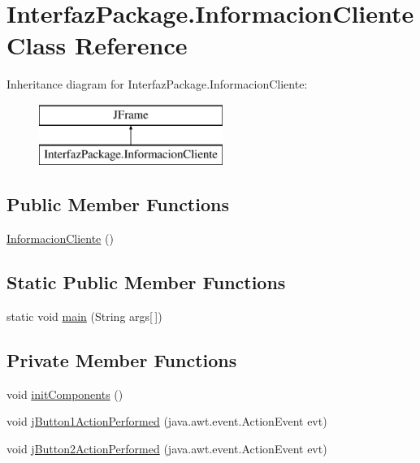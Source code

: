 \hypertarget{class_interfaz_package_1_1_informacion_cliente}{}\section{Interfaz\+Package.\+Informacion\+Cliente Class Reference}
\label{class_interfaz_package_1_1_informacion_cliente}
Inheritance diagram for Interfaz\+Package.\+Informacion\+Cliente\+:\begin{figure}[H]
\begin{center}
\leavevmode
\includegraphics[height=2.000000cm]{class_interfaz_package_1_1_informacion_cliente}
\end{center}
\end{figure}
\subsection*{Public Member Functions}
\begin{DoxyCompactItemize}
\item 
\mbox{\hyperlink{class_interfaz_package_1_1_informacion_cliente_aad6339ab89c410c65ca97dc545479efb}{Informacion\+Cliente}} ()
\end{DoxyCompactItemize}
\subsection*{Static Public Member Functions}
\begin{DoxyCompactItemize}
\item 
static void \mbox{\hyperlink{class_interfaz_package_1_1_informacion_cliente_a05c700e1fdb8597cf418336d39b717e9}{main}} (String args\mbox{[}$\,$\mbox{]})
\end{DoxyCompactItemize}
\subsection*{Private Member Functions}
\begin{DoxyCompactItemize}
\item 
void \mbox{\hyperlink{class_interfaz_package_1_1_informacion_cliente_ae00f35de867fe80d5298eeca5cd060e2}{init\+Components}} ()
\item 
void \mbox{\hyperlink{class_interfaz_package_1_1_informacion_cliente_ac9bf2de6739f822e7b6bc9f933c3a058}{j\+Button1\+Action\+Performed}} (java.\+awt.\+event.\+Action\+Event evt)
\item 
void \mbox{\hyperlink{class_interfaz_package_1_1_informacion_cliente_abc5f4088b44b2ba167f13466732dec5c}{j\+Button2\+Action\+Performed}} (java.\+awt.\+event.\+Action\+Event evt)
\end{DoxyCompactItemize}
